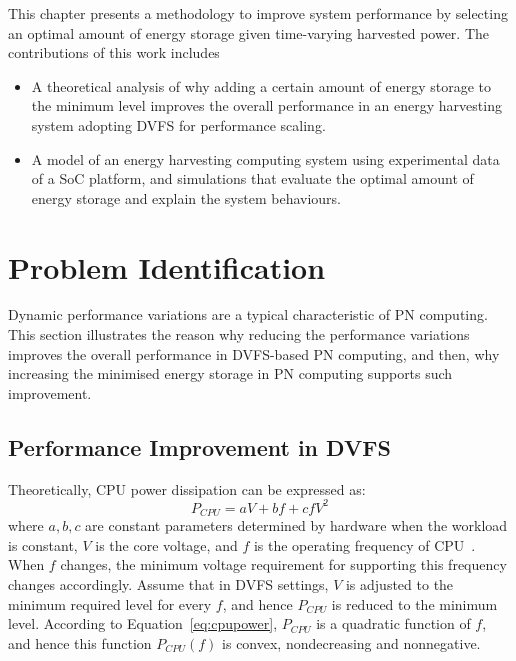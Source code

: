 This chapter presents a methodology to improve system performance by selecting an optimal amount of energy storage given time-varying harvested power. The contributions of this work includes
\begin{itemize}
    \item A theoretical analysis of why adding a certain amount of energy storage to the minimum level improves the overall performance in an energy harvesting system adopting DVFS for performance scaling. 
    \item A model of an energy harvesting computing system using experimental data of a SoC platform, and simulations that evaluate the optimal amount of energy storage and explain the system behaviours.
\end{itemize} 

\section{Problem Identification}

Dynamic performance variations are a typical characteristic of PN computing. This section illustrates the reason why reducing the performance variations improves the overall performance in DVFS-based PN computing, and then, why increasing the minimised energy storage in PN computing supports such improvement.

\subsection{Performance Improvement in DVFS}

Theoretically, CPU power dissipation can be expressed as:
\begin{equation} \label{eq:cpupower}
    P_{CPU} = a V + b f + c f V^2
\end{equation}
where $a,b,c$ are constant parameters determined by hardware when the workload is constant, $V$ is the core voltage, and $f$ is the operating frequency of CPU~\cite{travers2015cpu}. When $f$ changes, the minimum voltage requirement for supporting this frequency changes accordingly. Assume that in DVFS settings, $V$ is adjusted to the minimum required level for every $f$, and hence $P_{CPU}$ is reduced to the minimum level. According to Equation~\ref{eq:cpupower}, $P_{CPU}$ is a quadratic function of $f$, and hence this function $P_{CPU}(f)$ is convex, nondecreasing and nonnegative. 

